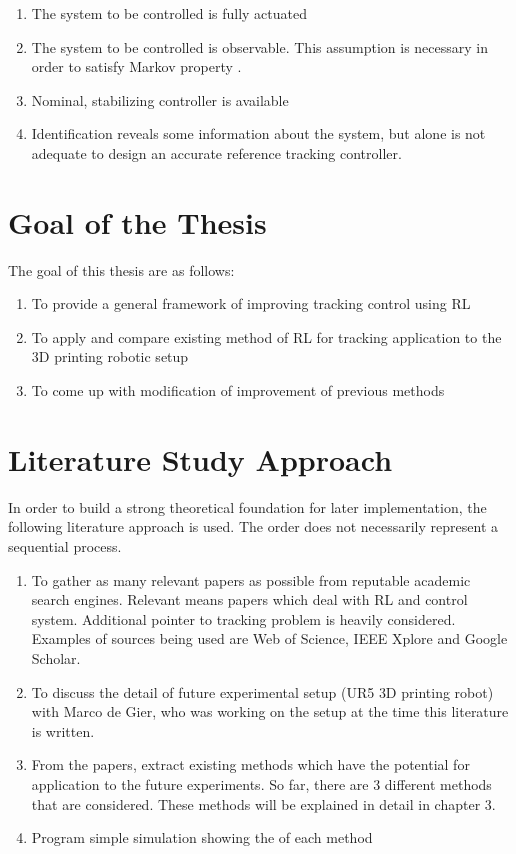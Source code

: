 \begin{enumerate}
	\item The system to be controlled is fully actuated
	\item The system to be controlled is observable. This assumption is necessary in order to satisfy Markov property \cite{sutton1998reinforcement}.
	\item Nominal, stabilizing controller is available	
	\item Identification reveals some information about the system, but alone is not adequate to design an accurate reference tracking controller.
\end{enumerate}

\section{Goal of the Thesis}

The goal of this thesis are as follows:
\begin{enumerate}
\item To provide a general framework of improving tracking control using \ac{RL}
\item To apply and compare existing method of \ac{RL} for tracking application to the 3D printing robotic setup
\item To come up with modification of improvement of previous methods
\end{enumerate}

\section{Literature Study Approach}
In order to build a strong theoretical foundation for later implementation, the following literature approach is used. The order does not necessarily represent a sequential process.
\begin{enumerate}
	\item To gather as many relevant papers as possible from reputable academic search engines. Relevant means papers which deal with \ac{RL} and control system. Additional pointer to tracking problem is heavily considered. Examples of sources being used are Web of Science, IEEE Xplore and Google Scholar.
	\item To discuss the detail of future experimental setup (UR5 \ac{3D} printing robot) with Marco de Gier, who was working on the setup at the time this literature is written.
	\item From the papers, extract existing methods which have the potential for application to the future experiments. So far, there are 3 different methods that are considered. These methods will be explained in detail in chapter 3.
	\item Program simple simulation showing the of each method
	
\end{enumerate}


